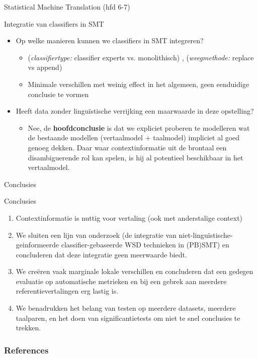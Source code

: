 \documentclass[8pt]{beamer}
\begin{document}
\begin{frame}{Statistical Machine Translation (hfd 6-7)}
    \begin{block}{Integratie van classifiers in SMT}
        \begin{itemize}
            \item Op welke manieren kunnen we classifiers in SMT integreren?
            \begin{itemize}
                \item \color{teal} \footnotesize{(\emph{classifiertype:} classifier experts vs. monolithisch) , (\emph{weegmethode:} replace vs append)}
                \item Minimale verschillen met weinig effect in het algemeen, geen eenduidige conclusie te vormen
            \end{itemize}
            \item Heeft data zonder linguïstische verrijking een maarwaarde in deze opstelling?
            \begin{itemize}
                \item Nee, \color{teal} de \textbf{hoofdconclusie} is dat we expliciet proberen te modelleren wat de bestaande modellen
                    (vertaalmodel + taalmodel) impliciet al goed genoeg dekken. Daar waar contextinformatie uit de
                    brontaal een disambiguerende rol kan spelen, is hij al potentieel beschikbaar in het vertaalmodel.
           \end{itemize}
        \end{itemize}
    \end{block}
\end{frame}

\begin{frame}{Conclusies}
    \begin{block}{Conclusies}
        \begin{enumerate}
            \item Contextinformatie is nuttig voor vertaling (ook met anderstalige context)
            \item We sluiten een lijn van onderzoek
                \citep{Stroppa+07,Rejwanul+11}
                {\color{teal} \footnotesize (de integratie van niet-linguïstische-geinformeerde
                classifier-gebaseerde WSD technieken in (PB)SMT)}
                en concluderen dat deze integratie geen meerwaarde
                biedt.
            \item \color{teal} We creëren vaak marginale lokale verschillen en concluderen dat een gedegen evaluatie op automatische
                metrieken en bij een gebrek aan meerdere referentievertalingen erg lastig is.
            \item \color{teal} We benadrukken het belang van testen op meerdere datasets, meerdere taalparen, en het doen van
                significantietests om niet te snel conclusies te trekken.
        \end{enumerate}
    \end{block}
\end{frame}

\begin{frame}[allowframebreaks]
        \frametitle{References}
        
        
\end{frame}
\end{document}
